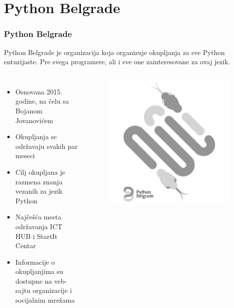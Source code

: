 \documentclass[hyperref={bookmarks=false},aspectratio=169]{beamer}
\begin{document}
\section{Python Belgrade}
\begin{frame}
\frametitle{Python Belgrade}
Python Belgrade je organizacija koja organizuje okupljanja za sve Python entuzijaste. Pre svega programere, ali i sve one zainteresovane za ovaj jezik.

\begin{columns}[T]

\begin{itemize}
    \item Osnovana 2015. godine, na čelu sa Bojanom Jovanovićem
    \item Okupljanja se održavaju svakih par meseci
    \item Cilj okupljana je razmena znanja vezanih za jezik Python
    \item Najčešća mesta održavanja ICT HUB i StartIt Centar
    \item Informacije o okupljanjima su dostupne na veb-sajtu organizacije i socijalnim mrežama
\end{itemize}

\begin{figure}
    \raggedleft
    \includegraphics[scale=0.075]{./images/pybgd.png}
\end{figure}

\end{columns}

\end{frame}
\end{document}
